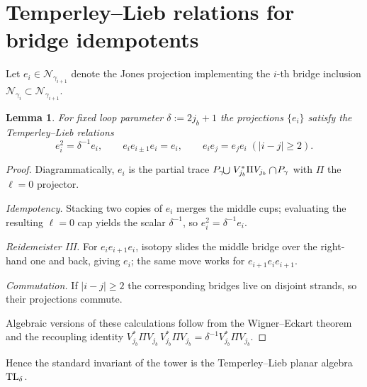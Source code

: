 \documentclass[11pt]{article}
\newtheorem{lemma}{Lemma}[section]
\begin{document}
\appendix
\section{Temperley--Lieb relations for bridge idempotents}\label{app:TL}

Let $e_i\in\mathcal N_{\gamma_{i+1}}$ denote the Jones projection 
implementing the $i$-th bridge inclusion 
$\mathcal N_{\gamma_i}\subset\mathcal N_{\gamma_{i+1}}$.

\begin{lemma}
For fixed loop parameter $\delta := 2j_b+1$ the projections $\{e_i\}$
satisfy the Temperley--Lieb relations
\[
  e_i^2 = \delta^{-1} e_i,\qquad
  e_i e_{i\pm1} e_i = e_i,\qquad
  e_i e_j = e_j e_i\;( |i-j|\ge 2).
\]
\end{lemma}

\begin{proof}
Diagrammatically, $e_i$ is the partial trace
\(
  \smash{P_\gamma\!\mathbin{\raisebox{-0.3ex}{\scalebox{1.2}{$\cup$}}}}
  \;V_{j_b}^{*}\Pi V_{j_b}
  \mathbin{\raisebox{-0.3ex}{\scalebox{1.2}{$\cap$}}}\!P_\gamma
\)
with $\Pi$ the $\ell=0$ projector.  

\emph{Idempotency.}  
Stacking two copies of $e_i$ merges the middle cups; 
evaluating the resulting $\ell=0$ cap yields the scalar $\delta^{-1}$, 
so $e_i^2=\delta^{-1}e_i$.

\emph{Reidemeister III.}  
For $e_ie_{i+1}e_i$, isotopy slides the middle bridge over the right‐hand one
and back, giving $e_i$; the same move works for $e_{i+1}e_ie_{i+1}$.

\emph{Commutation.}  
If $|i-j|\ge2$ the corresponding bridges live on disjoint strands, so their
projections commute.

Algebraic versions of these calculations follow from the 
Wigner--Eckart theorem and the recoupling identity 
$V_{j_b}^{*}\Pi V_{j_b}\,V_{j_b}^{*}\Pi V_{j_b}= \delta^{-1} V_{j_b}^{*}\Pi V_{j_b}$.
\end{proof}

Hence the standard invariant of the tower is the Temperley--Lieb
planar algebra ${\rm TL}_\delta$.
\end{document}
